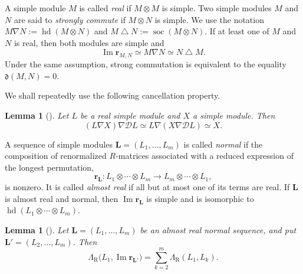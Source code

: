 \documentclass[12pt, reqno]{amsart}
\theoremstyle{plain}
\newtheorem{lemma}[theorem]{Lemma}
\theoremstyle{definition}
\numberwithin{equation}{section}
\newcommand{\LambdaR}{\Lambda_{\mathrm R}}
\begin{document}
A simple module \(M\) is called \emph{real} if \(M\otimes M\) is simple.
Two simple modules \(M\) and \(N\) are said to \emph{strongly commute} if
\(M\otimes N\) is simple. We use the notation
\(M\nabla N:=\operatorname{hd}(M\otimes N)\) and
\(M\mathbin{\triangle}N:=\operatorname{soc}(M\otimes N)\). If at least
one of \(M\) and \(N\) is real, then both modules are simple and
\begin{equation}\label{eq:image-R-matrix-head-socle}
    \operatorname{Im}\mathbf r_{M,N}
    \simeq M\nabla N
    \simeq N\mathbin{\triangle}M.
\end{equation}
Under the same assumption, strong commutation is equivalent to the equality
\(\mathfrak d(M,N)=0\).

We shall repeatedly use the following cancellation property.

\begin{lemma}[{\cite[Corollary~3.13]{kang2015simplicity}}]\label{lem:cancel}
    Let \(L\) be a real simple module and \(X\) a simple module. Then
    \begin{equation}\label{eq:categorical-cancellation}
        (L\nabla X)\nabla\mathcal D L
        \simeq L\nabla(X\nabla\mathcal D L)
        \simeq X.
    \end{equation}
\end{lemma}

A sequence of simple modules \(\mathbf L=(L_1,\ldots,L_m)\) is called
\emph{normal} if the composition of renormalized \(R\)-matrices associated
with a reduced expression of the longest permutation,
\begin{equation}\label{eq:R-matrix-normal-sequence}
    \mathbf r_{\mathbf L}\colon
    L_1\otimes\cdots\otimes L_m
    \longrightarrow
    L_m\otimes\cdots\otimes L_1,
\end{equation}
is nonzero. It is called \emph{almost real} if all but at most one of its
terms are real. If \(\mathbf L\) is almost real and normal, then
\(\operatorname{Im}\mathbf r_{\mathbf L}\) is simple and is isomorphic to
\(\operatorname{hd}(L_1\otimes\cdots\otimes L_m)\).

\begin{lemma}[\cite{kashiwara2019laurent,kashiwara2023localizations}]\label{lem:normal-sequence}
    Let \(\mathbf L=(L_1,\ldots,L_m)\) be an almost real normal sequence,
    and put \(\mathbf L'=(L_2,\ldots,L_{m})\). Then
    \begin{equation}\label{eq:Lambda-normal-sequence}
        \LambdaR\bigl(L_1,\operatorname{Im}\mathbf r_{\mathbf L'}\bigr)
        =\sum_{k=2}^{m}\LambdaR(L_1,L_k).
    \end{equation}
\end{lemma}
\end{document}
